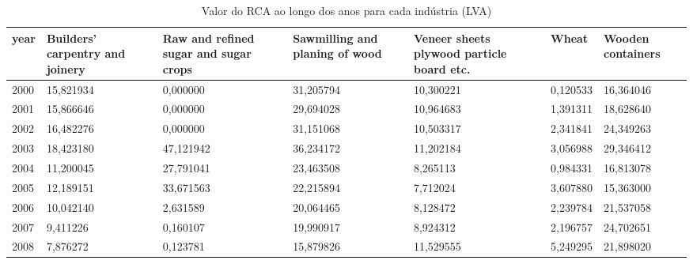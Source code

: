 \begin{table}
\centering
\caption{Valor do RCA ao longo dos anos para cada indústria (LVA)}
\begin{tabular}{p{1cm}p{2cm}p{2cm}p{2cm}p{2cm}p{2cm}p{2cm}}
\toprule
 year &  Builders' carpentry and joinery &  Raw and refined sugar and sugar crops &  Sawmilling and planing of wood &  Veneer sheets plywood particle board etc. &     Wheat &  Wooden containers \\
\midrule
 2000 &                        15,821934 &                               0,000000 &                       31,205794 &                                  10,300221 &  0,120533 &          16,364046 \\
 2001 &                        15,866646 &                               0,000000 &                       29,694028 &                                  10,964683 &  1,391311 &          18,628640 \\
 2002 &                        16,482276 &                               0,000000 &                       31,151068 &                                  10,503317 &  2,341841 &          24,349263 \\
 2003 &                        18,423180 &                              47,121942 &                       36,234172 &                                  11,202184 &  3,056988 &          29,346412 \\
 2004 &                        11,200045 &                              27,791041 &                       23,463508 &                                   8,265113 &  0,984331 &          16,813078 \\
 2005 &                        12,189151 &                              33,671563 &                       22,215894 &                                   7,712024 &  3,607880 &          15,363000 \\
 2006 &                        10,042140 &                               2,631589 &                       20,064465 &                                   8,128472 &  2,239784 &          21,537058 \\
 2007 &                         9,411226 &                               0,160107 &                       19,990917 &                                   8,924312 &  2,196757 &          24,702651 \\
 2008 &                         7,876272 &                               0,123781 &                       15,879826 &                                  11,529555 &  5,249295 &          21,898020 \\

\end{tabular}
\end{table}

